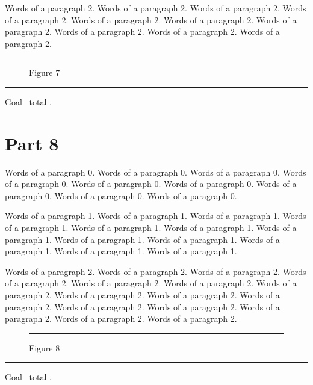 \documentclass{article}
\begin{document}
Words of a paragraph 2. Words of a paragraph 2. Words of a paragraph 2. Words of a paragraph 2. Words of a paragraph 2. Words of a paragraph 2. Words of a paragraph 2. Words of a paragraph 2. Words of a paragraph 2. Words of a paragraph 2. 

\begin{figure}[tp]\centering\rule{240pt}{179pt}\caption{Figure 7}\end{figure}
\noindent\rule{\linewidth}{0.4pt}\par Goal \the\pagegoal\ total \the\pagetotal.

\section{Part 8}
Words of a paragraph 0. Words of a paragraph 0. Words of a paragraph 0. Words of a paragraph 0. Words of a paragraph 0. Words of a paragraph 0. Words of a paragraph 0. Words of a paragraph 0. Words of a paragraph 0. 

Words of a paragraph 1. Words of a paragraph 1. Words of a paragraph 1. Words of a paragraph 1. Words of a paragraph 1. Words of a paragraph 1. Words of a paragraph 1. Words of a paragraph 1. Words of a paragraph 1. Words of a paragraph 1. Words of a paragraph 1. Words of a paragraph 1. 

Words of a paragraph 2. Words of a paragraph 2. Words of a paragraph 2. Words of a paragraph 2. Words of a paragraph 2. Words of a paragraph 2. Words of a paragraph 2. Words of a paragraph 2. Words of a paragraph 2. Words of a paragraph 2. Words of a paragraph 2. Words of a paragraph 2. Words of a paragraph 2. Words of a paragraph 2. Words of a paragraph 2. 

\begin{figure}[htbp]\centering\rule{260pt}{76pt}\caption{Figure 8}\end{figure}
\noindent\rule{\linewidth}{0.4pt}\par Goal \the\pagegoal\ total \the\pagetotal.
\end{document}
